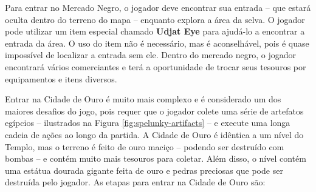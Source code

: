 Para entrar no Mercado Negro, o jogador deve encontrar sua entrada -- que estará
oculta dentro do terreno do mapa -- enquanto explora a área da selva. O jogador
pode utilizar um item especial chamado \textbf{Udjat Eye} para ajudá-lo a
encontrar a entrada da área. O uso do item não é necessário, mas é aconselhável,
pois é quase impossível de localizar a entrada sem ele. Dentro do mercado negro,
o jogador encontrará vários comerciantes e terá a oportunidade de trocar seus
tesouros por equipamentos e itens diversos.

Entrar na Cidade de Ouro é muito mais complexo e é considerado um dos maiores
desafios do jogo, pois requer que o jogador colete uma série de artefatos
egípcios -- ilustrados na Figura \ref{fig:spelunky-artifacts} -- e execute uma
longa cadeia de ações ao longo da partida. A Cidade de Ouro é idêntica a um
nível do Templo, mas o terreno é feito de ouro maciço -- podendo ser destruído
com bombas -- e contém muito mais tesouros para coletar.  Além disso, o nível
contém uma estátua dourada gigante feita de ouro e pedras preciosas que pode ser
destruída pelo jogador. As etapas para entrar na Cidade de Ouro são:

